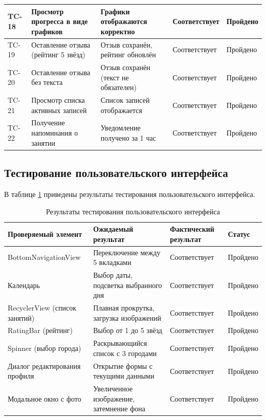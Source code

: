 \begin{longtable}{|p{1.4cm}|p{4cm}|p{3.8cm}|p{3cm}|p{2.2cm}|}
	\hline
	TC-18 & Просмотр прогресса в виде графиков & Графики отображаются корректно & Соответствует & Пройдено \\
	\hline
	TC-19 & Оставление отзыва (рейтинг 5 звёзд) & Отзыв сохранён, рейтинг обновлён & Соответствует & Пройдено \\
	\hline
	TC-20 & Оставление отзыва без текста & Отзыв сохранён (текст не обязателен) & Соответствует & Пройдено \\
	\hline
	TC-21 & Просмотр списка активных записей & Список записей отображается & Соответствует & Пройдено \\
	\hline
	TC-22 & Получение напоминания о занятии & Уведомление получено за 1 час & Соответствует & Пройдено \\
	\hline
\end{longtable}
\renewcommand{\arraystretch}{1}

\subsection{Тестирование пользовательского интерфейса}

В таблице \ref{tab:ui_tests} приведены результаты тестирования пользовательского интерфейса.

\renewcommand{\arraystretch}{1.3}
\begin{table}[H]
	\centering
	\caption{Результаты тестирования пользовательского интерфейса}
	\label{tab:ui_tests}
	\normalsize
	\setlength{\tabcolsep}{6pt}
	\begin{tabular}{|p{5cm}|p{4.2cm}|p{3.3cm}|p{2.5cm}|}
		\hline
		\textbf{Проверяемый элемент} & \textbf{Ожидаемый результат} & \textbf{Фактический результат} & \textbf{Статус} \\
		\hline
		BottomNavigationView & Переключение между 5 вкладками & Соответствует & Пройдено \\
		\hline
		Календарь & Выбор даты, подсветка выбранного дня & Соответствует & Пройдено \\
		\hline
		RecyclerView (список занятий) & Плавная прокрутка, загрузка изображений & Соответствует & Пройдено \\
		\hline
		RatingBar (рейтинг) & Выбор от 1 до 5 звёзд & Соответствует & Пройдено \\
		\hline
		Spinner (выбор города) & Раскрывающийся список с 3 городами & Соответствует & Пройдено \\
		\hline
		Диалог редактирования профиля & Открытие формы с текущими данными & Соответствует & Пройдено \\
		\hline
		Модальное окно с фото & Увеличенное изображение, затемнение фона & Соответствует & Пройдено \\
		\hline
	\end{tabular}
\end{table}
\renewcommand{\arraystretch}{1}

